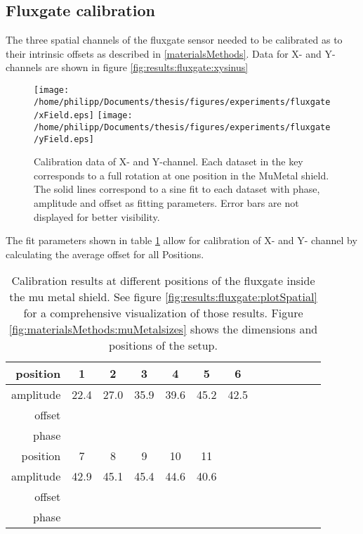     \subsection{Fluxgate calibration}
    The three spatial channels of the fluxgate sensor needed to be calibrated as to their intrinsic offsets as described in \ref{materialsMethods}. Data for X- and Y-channels are shown in figure \ref{fig:results:fluxgate:xysinus}
        \begin{figure}[h]
            \label{fig:results:fluxgate:ysinus}
            \centering
            \texttt{[image: /home/philipp/Documents/thesis/figures/experiments/fluxgate/xField.eps]}
            \texttt{[image: /home/philipp/Documents/thesis/figures/experiments/fluxgate/yField.eps]}
            \caption[Calibration results X/Y]{Calibration data of X- and Y-channel. Each dataset in the key corresponds to a full rotation at one position in the MuMetal shield. The solid lines correspond to a sine fit to each dataset with phase, amplitude and offset as fitting parameters. Error bars are not displayed for better visibility.}
        \end{figure}
        The fit parameters shown in table \ref{table:results:calibrationFitParams} allow for calibration of X- and Y- channel by calculating the average offset for all Positions.
        \begin{table}
            \centering
            \label{table:results:calibrationFitParams}
            \begin{tabular}{r|cccccccccccc}
                \label{table:results:calibrationFitParams}
                position & 1& 2 & 3 & 4 & 5 & 6\\
                \hline
                amplitude & 22.4 & 27.0 & 35.9 & 39.6 & 45.2 & 42.5\\ 
                offset \\
                phase \\
                \hline
                position & 7 & 8 & 9 & 10 & 11 \\
                \hline
                amplitude & 42.9 & 45.1 & 45.4 & 44.6 & 40.6\\
                offset \\
                phase
            \end{tabular}
            \caption[Fluxgate calibration results]{Calibration results at different positions of the fluxgate inside the mu metal shield. See figure \ref{fig:results:fluxgate:plotSpatial} for a comprehensive visualization of those results. Figure \ref{fig:materialsMethods:muMetalsizes} shows the dimensions and positions of the setup.}
        \end{table}
